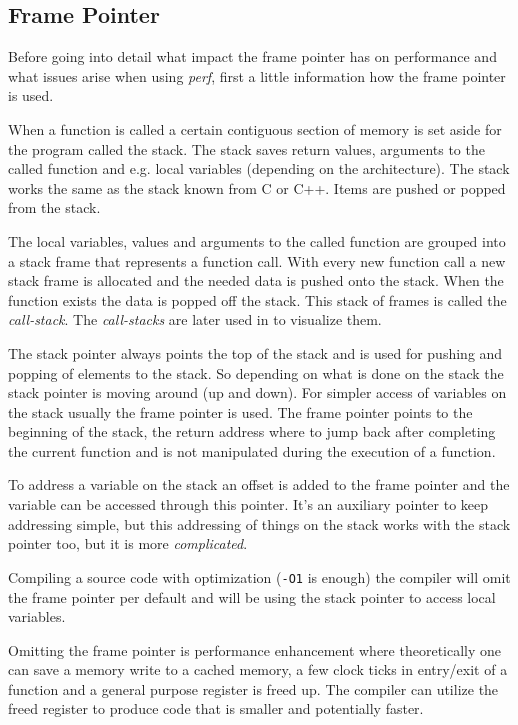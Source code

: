 \subsection[framep]{Frame Pointer}

Before going into detail what impact the frame pointer has on
performance and what issues arise when using {\em perf}, first a little
information how the frame pointer is used.

When a function is called a certain contiguous section of memory is
set aside for the program called the stack. The stack saves return
values, arguments to the called function and e.g. local variables
(depending on the architecture). The stack works the same as the stack
known from C or C++. Items are pushed or popped from the stack.

The local variables, values and arguments to the called function are
grouped into a stack frame that represents a function call. With every
new function call a new stack frame is allocated and the needed data
is pushed onto the stack. When the function exists the data is popped
off the stack. This stack of frames is called the {\em call-stack}.
The {\em call-stacks} are later used in \in[fgraph] \about[fgraph] to
visualize them.

\startplacemarginfigure[ title={A small rectangle
put in the margin.}, reference=fig1]
\externalfigure[stack][marginwidth]
\stopplacemarginfigure

The stack pointer always points the top of the stack and is used for
pushing and popping of elements to the stack. So depending on what is
done on the stack the stack pointer is moving around (up and
down). For simpler access of variables on the stack usually the frame
pointer is used. The frame pointer points to the beginning of the
stack, the return address where to jump back after completing the
current function and is not manipulated during the execution of a
function.

To address a variable on the stack an offset is added to the frame
pointer and the variable can be accessed through this pointer. It's an
auxiliary pointer to keep addressing simple, but this addressing of
things on the stack works with the stack pointer too, but it is more
{\em complicated}.

Compiling a source code with optimization ({\tt -O1} is enough) the
compiler will omit the frame pointer per default and will be using the
stack pointer to access local variables.

Omitting the frame pointer is performance enhancement where
theoretically one can save a memory write to a cached memory, a few
clock ticks in entry/exit of a function and a general purpose register
is freed up. The compiler can utilize the freed register to produce
code that is smaller and potentially faster.

